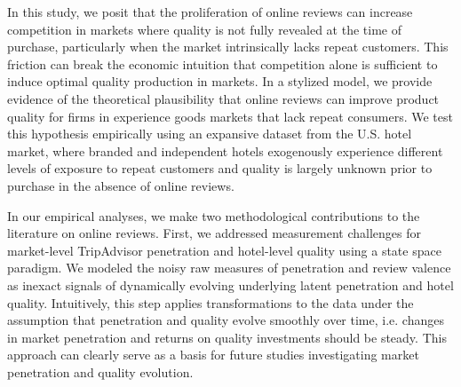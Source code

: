 \documentclass[12pt, leqno]{article}
\begin{document}
In this study, we posit that the proliferation of online reviews can increase competition in markets where quality is not fully revealed at the time of purchase, particularly when the market intrinsically lacks repeat customers. This friction can break the economic intuition that competition alone is sufficient to induce optimal quality production in markets. In a stylized model, we provide evidence of the theoretical plausibility that online reviews can improve product quality for firms in experience goods markets that lack repeat consumers. We test this hypothesis empirically using an expansive dataset from the U.S. hotel market, where branded and independent hotels exogenously experience different levels of exposure to repeat customers and quality is largely unknown prior to purchase in the absence of online reviews. 

In our empirical analyses, we make two methodological contributions to the literature on online reviews. First, we addressed measurement challenges for market-level TripAdvisor penetration and hotel-level quality using a state space paradigm. We modeled the noisy raw measures of penetration and review valence as inexact signals of dynamically evolving underlying latent penetration and hotel quality. Intuitively, this step applies transformations to the data under the assumption that penetration and quality evolve smoothly over time, i.e. changes in market penetration and returns on quality investments should be steady. This approach can clearly serve as a basis for future studies investigating market penetration and quality evolution.
\end{document}
